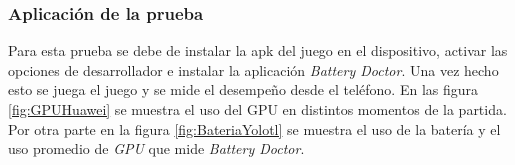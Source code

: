 \subsubsection{Aplicación de la prueba}
Para esta prueba se debe de instalar la apk del juego en el dispositivo, activar las
opciones de desarrollador e instalar la aplicación \textit{Battery Doctor}.  Una vez
hecho esto se juega el juego y se mide el desempeño desde el teléfono. En las figura
\ref{fig:GPUHuawei} se muestra el uso del GPU en distintos momentos de la
partida. Por otra parte en la figura \ref{fig:BateriaYolotl} se muestra el uso
de la batería y el uso promedio de \textit{GPU} que mide \textit{Battery Doctor}.
\\
\par
\begin{figure}
  \centering
 
   
   
   
   

\end{figure}
